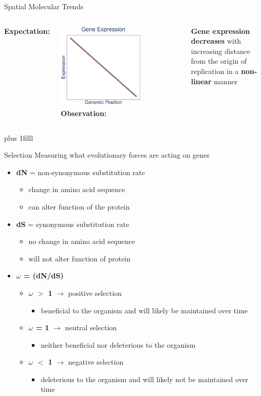 \documentclass{beamer}
\makeatletter
\newcommand{\bi}{\begin{itemize}}
\newcommand{\ei}{\end{itemize}}
\newcommand{\sourceright}[1]{\begin{textblock*}{}
		\begin{beamercolorbox}[ht=0.5cm,left]{framesource}
			\usebeamerfont{framesource}\usebeamercolor[berry]{framesource}
			{#1}
		\end{beamercolorbox}
	\end{textblock*}}
\newcommand{\itm}{\item<itm@1->}
\newcommand{\btVFill}{\vskip0pt plus 1filll}
\makeatother
\begin{document}
\begin{frame}{Spatial Molecular Trends}
	\begin{columns}[t]
		\textbf{Expectation: }
		\centering
		\bigskip
		
		\includegraphics[width=0.67\textwidth]{./exp_graph.pdf}
		\textbf{Observation: }
		\bigskip 
		
		\textbf{Gene expression decreases} with increasing distance from the origin of replication in a \textbf{non-linear} manner
	\end{columns}
	
	\btVFill
	\tiny \vspace{-\baselineskip}\color{berry}{Couturier et al. 2006, Cooper et al. 2010, Sharp et al. 2005, Morrow et al. 2012, Cooper and Rocha 2006}
	
\end{frame}

\begin{frame}{Selection}
	Measuring what evolutionary forces are acting on genes
	\bi
	\itm \textbf{dN} = non-synonymous substitution rate
		\bi
		\itm change in amino acid sequence
		\itm can alter function of the protein
		\ei
	\itm \textbf{dS} = synonymous substitution rate
		\bi
		\itm no change in amino acid sequence
		\itm will not alter function of protein
		\ei
	\itm \textbf{ $\omega$ = (dN/dS)}
		\bi
		\itm \textbf{$\omega$ $>$ 1} $\rightarrow$ positive selection
			\bi
			\itm beneficial to the organism and will likely be maintained over time
			\ei
		\itm \textbf{$\omega$ = 1} $\rightarrow$ neutral selection
			\bi
			\itm neither beneficial nor deleterious to the organism
			\ei
		\itm \textbf{$\omega$ $<$ 1} $\rightarrow$ negative selection
			\bi
			\itm deleterious to the organism and will likely not be maintained over time
			\ei
		\ei
	\ei
\end{frame}
\end{document}
